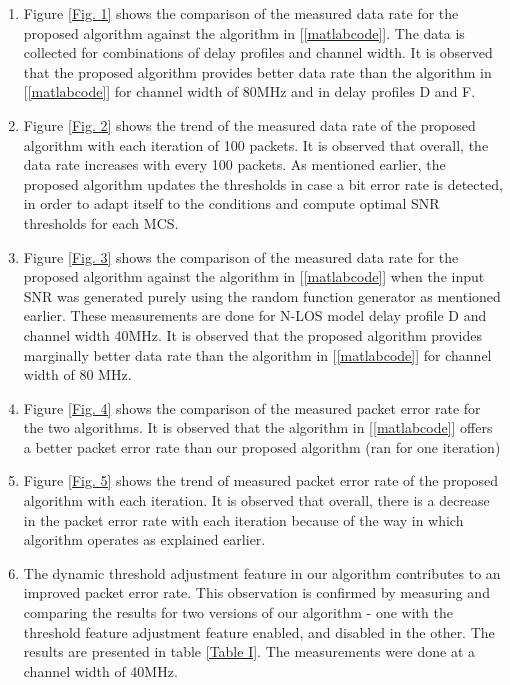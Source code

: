 \documentclass[a4paper, 10pt, conference]{ieeeconf}
\begin{document}
\begin{enumerate}
    \item Figure \ref{Fig. 1} shows the comparison of the measured data rate for the proposed algorithm against the algorithm in [\ref{matlabcode}]. The data is collected for combinations of delay profiles and channel width. It is observed that the proposed algorithm provides better data rate than the algorithm in [\ref{matlabcode}] for channel width of 80MHz and in delay profiles D and F.
    
    \item Figure \ref{Fig. 2} shows the trend of the measured data rate of the proposed algorithm with each iteration of 100 packets. It is observed that overall, the data rate increases with every 100 packets. As mentioned earlier, the proposed algorithm updates the thresholds in case a bit error rate is detected, in order to adapt itself to the conditions and compute optimal SNR thresholds for each MCS. 
    
    \item Figure \ref{Fig. 3} shows the comparison of the measured data rate for the proposed algorithm against the algorithm in [\ref{matlabcode}] when the input SNR was generated purely using the random function generator as mentioned earlier. These measurements are done for N-LOS model delay profile D and channel width 40MHz. It is observed that the proposed algorithm provides marginally better data rate than the algorithm in [\ref{matlabcode}] for channel width of 80 MHz.
    
    \item Figure \ref{Fig. 4} shows the comparison of the measured packet error rate for the two algorithms. It is observed that the algorithm in [\ref{matlabcode}] offers a better packet error rate than our proposed algorithm (ran for one iteration)
    
    \item Figure \ref{Fig. 5} shows the trend of measured packet error rate of the proposed algorithm with each iteration. It is observed that overall, there is a decrease in the packet error rate with each iteration because of the way in which algorithm operates as explained earlier.
    
    \item The dynamic threshold adjustment feature in our algorithm contributes to an improved packet error rate. This observation is confirmed by measuring and comparing the results for two versions of our algorithm - one with the threshold feature adjustment feature enabled, and disabled in the other. The results are presented in table \ref{Table I}. The measurements were done at a channel width of 40MHz.
    
\end{enumerate}
\end{document}
